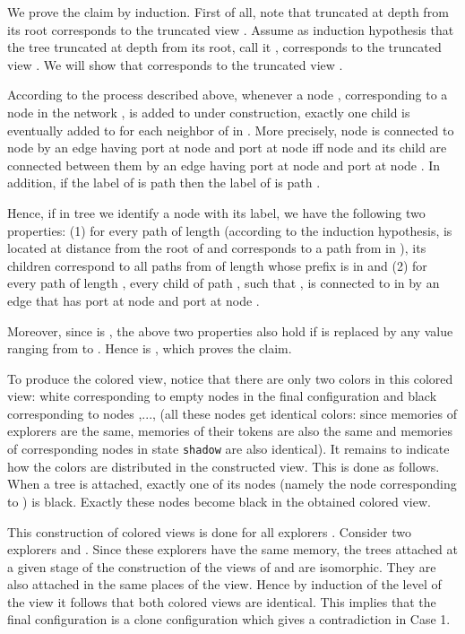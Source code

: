 \documentclass[11pt]{article}
\newcommand{\finclaim}{\hfill }
\newcommand{\qed}{\hfill  \bigbreak}
\newenvironment{proof}{\noindent {\bf Proof.}}{\qed}
\begin{document}
\begin{proof}
{We prove the claim by induction. First of all, note that  truncated at depth  from its root corresponds to the truncated view .
Assume as induction hypothesis that the tree  truncated at depth  from its root, call it , corresponds to the truncated view . We will show that  corresponds to the truncated view .}

{According to the process described above, whenever a node , corresponding to a node  in the network , is added to  under construction, exactly one child  is eventually added to  for each neighbor  of  in . More precisely, node  is connected to node  by an edge having port  at node  and port  at node  iff node  and its child  are connected between them by an edge having port  at node  and port  at node . In addition, if the label of  is path  then the label of  is path .}

{Hence, if in tree  we identify a node with its label, we have the following two properties: (1) for every path  of length  (according to the induction hypothesis,  is located at distance  from the root of  and corresponds to a path from  in ), its children correspond to all paths from  of length  whose prefix is  in  and (2) for every path  of length , every child  of path , such that , is connected to  in  by an edge that has port  at node  and port  at node .}

{Moreover, since  is , the above two properties also hold if  is replaced by any value ranging from  to . Hence  is , which proves the claim.} \finclaim

To produce the colored view, notice that there are only two colors in this colored view: white corresponding to empty nodes in the final configuration and
black corresponding to nodes ,...,  (all these nodes get identical colors: since memories of explorers are the same, memories of their tokens
are also the same and memories of corresponding nodes in state {\tt shadow} are also identical).  It remains to indicate how the colors are distributed
in the constructed view. This is done as follows. When a tree  is attached, exactly one of its nodes (namely the node corresponding to ) is black.
Exactly these nodes become black in the obtained colored view. 

This construction of colored views is done for all explorers . Consider two explorers  and .
Since these explorers have the same memory, the trees  attached at a given stage of the construction of the views of  and   are
isomorphic. They are also attached in the same places of the view. Hence by induction of the level of the view it follows that both colored views are identical.
This implies that the final configuration is a clone configuration which gives a contradiction in Case 1.


\end{proof}
\end{document}

